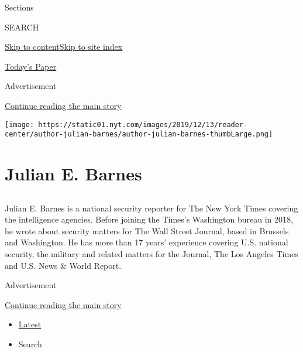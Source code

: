 Sections

SEARCH

\protect\hyperlink{site-content}{Skip to
content}\protect\hyperlink{site-index}{Skip to site index}

\href{https://myaccount.nytimes.com/auth/login?response_type=cookie\&client_id=vi}{}

\href{https://www.nytimes.com/section/todayspaper}{Today's Paper}

Advertisement

\protect\hyperlink{after-top}{Continue reading the main story}

\texttt{[image: https://static01.nyt.com/images/2019/12/13/reader-center/author-julian-barnes/author-julian-barnes-thumbLarge.png]}

\hypertarget{julian-e-barnes}{%
\section{Julian E. Barnes}\label{julian-e-barnes}}

\subsection{}

Julian E. Barnes is a national security reporter for The New York Times
covering the intelligence agencies. Before joining the Times's
Washington bureau in 2018, he wrote about security matters for The Wall
Street Journal, based in Brussels and Washington. He has more than 17
years' experience covering U.S. national security, the military and
related matters for the Journal, The Los Angeles Times and U.S. News \&
World Report.

Advertisement

\protect\hyperlink{after-mid1}{Continue reading the main story}

\begin{itemize}
\tightlist
\item
  \protect\hyperlink{stream-panel}{Latest}
\item
  Search
\end{itemize}

